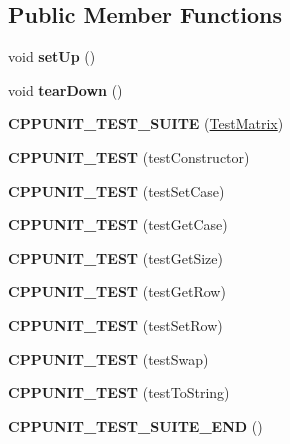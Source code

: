 \subsection*{Public Member Functions}
\begin{DoxyCompactItemize}
\item 
\mbox{\label{class_test_matrix_a346657f68e41e972c31a3a06bc548f97}} 
void {\bfseries set\+Up} ()
\item 
\mbox{\label{class_test_matrix_a4301c47b264a6e6812bf3de1db1d8c65}} 
void {\bfseries tear\+Down} ()
\item 
\mbox{\label{class_test_matrix_a32d62c3a9016988349e65a9d39789438}} 
{\bfseries C\+P\+P\+U\+N\+I\+T\+\_\+\+T\+E\+S\+T\+\_\+\+S\+U\+I\+TE} (\mbox{\hyperlink{class_test_matrix}{Test\+Matrix}})
\item 
\mbox{\label{class_test_matrix_a4d71232b87e25b766eb6f56d9e4ecddb}} 
{\bfseries C\+P\+P\+U\+N\+I\+T\+\_\+\+T\+E\+ST} (test\+Constructor)
\item 
\mbox{\label{class_test_matrix_addbb4918f1566eea6f278f2bdcf018dd}} 
{\bfseries C\+P\+P\+U\+N\+I\+T\+\_\+\+T\+E\+ST} (test\+Set\+Case)
\item 
\mbox{\label{class_test_matrix_a43ddfa35f19f36020d23928a5ebb955d}} 
{\bfseries C\+P\+P\+U\+N\+I\+T\+\_\+\+T\+E\+ST} (test\+Get\+Case)
\item 
\mbox{\label{class_test_matrix_aea273020f84ca0e7df6916a96a03af66}} 
{\bfseries C\+P\+P\+U\+N\+I\+T\+\_\+\+T\+E\+ST} (test\+Get\+Size)
\item 
\mbox{\label{class_test_matrix_a5762422d5421d93092a712ca3cd823dc}} 
{\bfseries C\+P\+P\+U\+N\+I\+T\+\_\+\+T\+E\+ST} (test\+Get\+Row)
\item 
\mbox{\label{class_test_matrix_aac54a36d93a339f2a3252824a4888f7f}} 
{\bfseries C\+P\+P\+U\+N\+I\+T\+\_\+\+T\+E\+ST} (test\+Set\+Row)
\item 
\mbox{\label{class_test_matrix_a69ddbfe49192a4c458fc248d8614ac52}} 
{\bfseries C\+P\+P\+U\+N\+I\+T\+\_\+\+T\+E\+ST} (test\+Swap)
\item 
\mbox{\label{class_test_matrix_a48ddb3a8653890f07cfa89d28c7ee203}} 
{\bfseries C\+P\+P\+U\+N\+I\+T\+\_\+\+T\+E\+ST} (test\+To\+String)
\item 
\mbox{\label{class_test_matrix_a711d045c39c0d48a39b2f92e2644e367}} 
{\bfseries C\+P\+P\+U\+N\+I\+T\+\_\+\+T\+E\+S\+T\+\_\+\+S\+U\+I\+T\+E\+\_\+\+E\+ND} ()
\end{DoxyCompactItemize}


